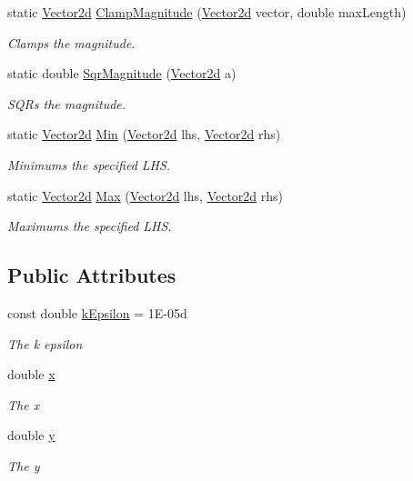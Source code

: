 \begin{DoxyCompactItemize}
static \hyperlink{struct_unity_engine_1_1_vector2d}{Vector2d} \hyperlink{struct_unity_engine_1_1_vector2d_a42def52ec6e0d493e60387a1f09912e0}{Clamp\+Magnitude} (\hyperlink{struct_unity_engine_1_1_vector2d}{Vector2d} vector, double max\+Length)
\begin{DoxyCompactList}\small\item\em Clamps the magnitude. \end{DoxyCompactList}\item 
static double \hyperlink{struct_unity_engine_1_1_vector2d_a3da9a9a2a6d709397301e6b983b3dc0a}{Sqr\+Magnitude} (\hyperlink{struct_unity_engine_1_1_vector2d}{Vector2d} a)
\begin{DoxyCompactList}\small\item\em S\+Q\+Rs the magnitude. \end{DoxyCompactList}\item 
static \hyperlink{struct_unity_engine_1_1_vector2d}{Vector2d} \hyperlink{struct_unity_engine_1_1_vector2d_a6bf33ee8696ebccda6e6cd8c117c30ae}{Min} (\hyperlink{struct_unity_engine_1_1_vector2d}{Vector2d} lhs, \hyperlink{struct_unity_engine_1_1_vector2d}{Vector2d} rhs)
\begin{DoxyCompactList}\small\item\em Minimums the specified L\+HS. \end{DoxyCompactList}\item 
static \hyperlink{struct_unity_engine_1_1_vector2d}{Vector2d} \hyperlink{struct_unity_engine_1_1_vector2d_a99aac65326560891d6835427870c7908}{Max} (\hyperlink{struct_unity_engine_1_1_vector2d}{Vector2d} lhs, \hyperlink{struct_unity_engine_1_1_vector2d}{Vector2d} rhs)
\begin{DoxyCompactList}\small\item\em Maximums the specified L\+HS. \end{DoxyCompactList}\end{DoxyCompactItemize}
\subsection*{Public Attributes}
\begin{DoxyCompactItemize}
\item 
const double \hyperlink{struct_unity_engine_1_1_vector2d_a64e0dc4e0bdcf78cc0ea14e8d07f57ba}{k\+Epsilon} = 1\+E-\/05d
\begin{DoxyCompactList}\small\item\em The k epsilon \end{DoxyCompactList}\item 
double \hyperlink{struct_unity_engine_1_1_vector2d_ac730b1953750d27bc7adfdd55188d2f3}{x}
\begin{DoxyCompactList}\small\item\em The x \end{DoxyCompactList}\item 
double \hyperlink{struct_unity_engine_1_1_vector2d_a85b7ce21094a46c2f68cd734cfa11729}{y}
\begin{DoxyCompactList}\small\item\em The y \end{DoxyCompactList}\end{DoxyCompactItemize}
